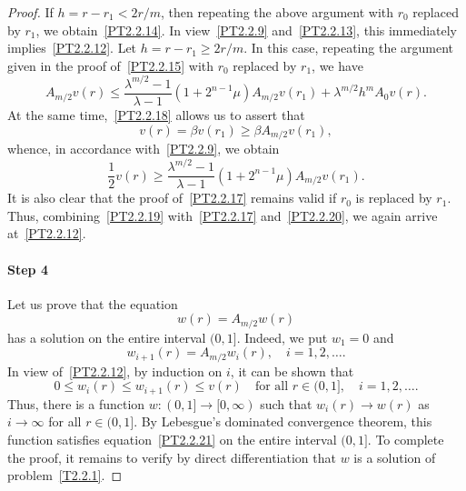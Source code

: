 \documentclass[10pt,a4paper]{amsart}
\begin{document}
\begin{proof}
If $h = r - r_1 < 2 r / m$, then repeating the above argument with $r_0$ replaced by $r_1$, we obtain~\eqref{PT2.2.14}. 
In view~\eqref{PT2.2.9} and~\eqref{PT2.2.13}, this immediately implies~\eqref{PT2.2.12}.
Let $h = r - r_1 \ge 2 r / m$.
In this case, repeating the argument given in the proof of~\eqref{PT2.2.15} with $r_0$ replaced by $r_1$, we have
\begin{equation}
	A_{m / 2} v (r)
	\le
	\frac{
		\lambda^{m / 2} - 1
	}{
		\lambda - 1
	}
	(1 + 2^{n - 1} \mu)
	A_{m / 2} v (r_1)
	+
	\lambda^{m / 2}
	h^m
	A_0 v (r).
	\label{PT2.2.19}
\end{equation}
At the same time,~\eqref{PT2.2.18} allows us to assert that
$$
	v (r) = \beta v (r_1) \ge \beta A_{m / 2} v (r_1),
$$
whence, in accordance with~\eqref{PT2.2.9}, we obtain
\begin{equation}
	\frac{1}{2}
	v (r)
	\ge
	\frac{
		\lambda^{m / 2} - 1
	}{
		\lambda - 1
	}
	(1 + 2^{n - 1} \mu)
	A_{m / 2} v (r_1).
	\label{PT2.2.20}
\end{equation}
It is also clear that the proof of~\eqref{PT2.2.17} remains valid if $r_0$ is replaced by $r_1$.
Thus, combining~\eqref{PT2.2.19} with~\eqref{PT2.2.17} and~\eqref{PT2.2.20}, we again arrive at~\eqref{PT2.2.12}.

\paragraph{Step 4}
Let us prove that the equation
\begin{equation}
	w (r) = A_{m / 2} w (r)
	\label{PT2.2.21}
\end{equation}
has a solution on the entire interval $(0, 1]$. 
Indeed, we put $w_1 = 0$ and
$$
	w_{i + 1} (r) = A_{m / 2} w_i (r),
	\quad
	i = 1, 2, \ldots.
$$
In view of~\eqref{PT2.2.12}, by induction on $i$, it can be shown that 
$$
	0 \le w_i (r) \le w_{i + 1} (r) \le v (r) 
	\quad
	\mbox{for all } r \in (0, 1], 
	\quad
	i = 1, 2, \ldots.
$$
Thus, there is a function $w : (0, 1] \to [0, \infty)$ such that $w_i (r) \to w (r)$ as $i \to \infty$ for all $r \in (0, 1]$.
By Lebesgue's dominated convergence theorem, this function satisfies equation~\eqref{PT2.2.21} on the entire interval $(0, 1]$.
To complete the proof, it remains to verify by direct differentiation that $w$ is a solution of problem~\eqref{T2.2.1}.
\end{proof} 
\end{document}
